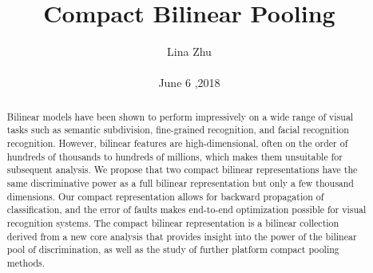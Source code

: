 \documentclass[10pt,twocolumn,letterpaper]{article}
\begin{document}
\title{Compact Bilinear Pooling}

\author{Lina Zhu\\\\June 6 ,2018}
\maketitle
\begin{abstract}
Bilinear models have been shown to perform impressively on a wide range of visual tasks such as semantic subdivision, fine-grained recognition, and facial recognition recognition. However, bilinear features are high-dimensional, often on the order of hundreds of thousands to hundreds of millions, which makes them unsuitable for subsequent analysis. We propose that two compact bilinear representations have the same discriminative power as a full bilinear representation but only a few thousand dimensions. Our compact representation allows for backward propagation of classification, and the error of faults makes end-to-end optimization possible for visual recognition systems. The compact bilinear representation is a bilinear collection derived from a new core analysis that provides insight into the power of the bilinear pool of discrimination, as well as the study of further platform compact pooling methods.
\end{abstract}
\end{document}
